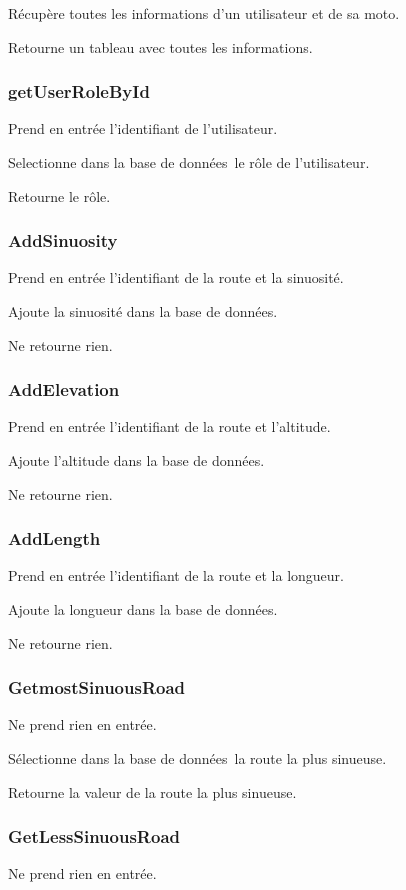 \documentclass[a4paper]{article}
\newcommand{\bdd}{base de données}
\begin{document}
Récupère toutes les informations d'un utilisateur et de sa moto.

Retourne un tableau avec toutes les informations.


\subsubsection{getUserRoleById}
Prend en entrée l'identifiant de l'utilisateur.

Selectionne dans la \bdd  \ le rôle de l'utilisateur.

Retourne le rôle.

\subsubsection{AddSinuosity}
Prend en entrée l'identifiant de la route et la sinuosité.

Ajoute la sinuosité dans la \bdd.

Ne retourne rien.

\subsubsection{AddElevation}
Prend en entrée l'identifiant de la route et l'altitude.

Ajoute l'altitude dans la \bdd.

Ne retourne rien.

\subsubsection{AddLength}
Prend en entrée l'identifiant de la route et la longueur.

Ajoute la longueur dans la \bdd.

Ne retourne rien.

\subsubsection{GetmostSinuousRoad}
Ne prend rien en entrée.

Sélectionne dans la \bdd \ la route la plus sinueuse.

Retourne la valeur de la route la plus sinueuse.

\subsubsection{GetLessSinuousRoad}
Ne prend rien en entrée.
\end{document}
